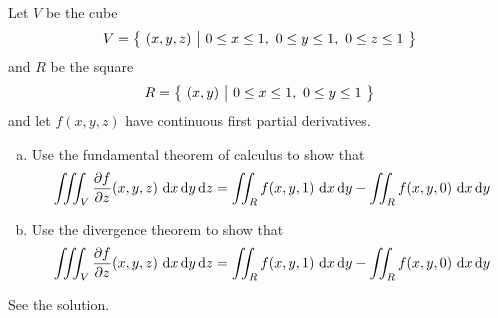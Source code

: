 

\subsection*{\Conceptual}

\begin{question}
Let $V$ be the cube
\begin{align*}
V=\big\{ \ (x,y,z)\ \big|\ 0\le x\le 1,\ 0\le y\le 1,\ 0\le z\le 1\ \big\}
\end{align*}
and $R$ be the square
\begin{align*}
R=\big\{ \ (x,y)\ \big|\ 0\le x\le 1,\ 0\le y\le 1\ \big\}
\end{align*}
and let $f(x,y,z)$ have continuous first partial derivatives.
\begin{enumerate}[(a)]
\item
Use the fundamental theorem of calculus to show that
\begin{align*}
\tripInt_V\frac{\partial f}{\partial z}(x,y,z)\ \dee{x}\,\dee{y}\,\dee{z}
=\dblInt_R f(x,y,1)\ \dee{x}\,\dee{y}
  - \dblInt_R f(x,y,0)\ \dee{x}\,\dee{y}
\end{align*}
\item
Use the divergence theorem to show that
\begin{align*}
\tripInt_V\frac{\partial f}{\partial z}(x,y,z)\ \dee{x}\,\dee{y}\,\dee{z}
=\dblInt_R f(x,y,1)\ \dee{x}\,\dee{y}
  - \dblInt_R f(x,y,0)\ \dee{x}\,\dee{y}
\end{align*}
\end{enumerate}
\end{question}

%

\begin{answer} 
See the solution.
\end{answer}

